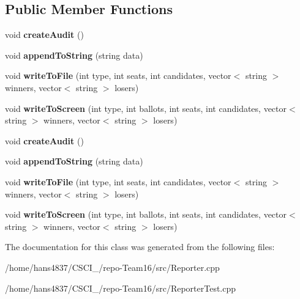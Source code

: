 \subsection*{Public Member Functions}
\begin{DoxyCompactItemize}
\item 
\mbox{\label{classReporter_a83f740722856a01617c46e05574681ae}} 
void {\bfseries create\+Audit} ()
\item 
\mbox{\label{classReporter_aa923dc71b57d43ac9c33159d5d250849}} 
void {\bfseries append\+To\+String} (string data)
\item 
\mbox{\label{classReporter_a4f98de86ab6d02bace97c8e101109dc1}} 
void {\bfseries write\+To\+File} (int type, int seats, int candidates, vector$<$ string $>$ winners, vector$<$ string $>$ losers)
\item 
\mbox{\label{classReporter_a47c43dfbd9e9319d35a64a4448584dd4}} 
void {\bfseries write\+To\+Screen} (int type, int ballots, int seats, int candidates, vector$<$ string $>$ winners, vector$<$ string $>$ losers)
\item 
\mbox{\label{classReporter_a83f740722856a01617c46e05574681ae}} 
void {\bfseries create\+Audit} ()
\item 
\mbox{\label{classReporter_aa923dc71b57d43ac9c33159d5d250849}} 
void {\bfseries append\+To\+String} (string data)
\item 
\mbox{\label{classReporter_a4f98de86ab6d02bace97c8e101109dc1}} 
void {\bfseries write\+To\+File} (int type, int seats, int candidates, vector$<$ string $>$ winners, vector$<$ string $>$ losers)
\item 
\mbox{\label{classReporter_a47c43dfbd9e9319d35a64a4448584dd4}} 
void {\bfseries write\+To\+Screen} (int type, int ballots, int seats, int candidates, vector$<$ string $>$ winners, vector$<$ string $>$ losers)
\end{DoxyCompactItemize}


The documentation for this class was generated from the following files\+:\begin{DoxyCompactItemize}
\item 
/home/hans4837/\+C\+S\+C\+I\+\_/repo-\/\+Team16/src/Reporter.\+cpp\item 
/home/hans4837/\+C\+S\+C\+I\+\_/repo-\/\+Team16/src/Reporter\+Test.\+cpp\end{DoxyCompactItemize}
